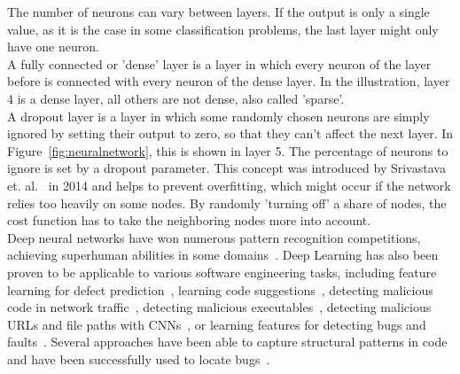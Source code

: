 \documentclass[
a4paper,
pagesize,
pdftex,
12pt,
twoside, %
BCOR=5mm, %
ngerman,
fleqn,
final,
]{scrartcl}
\begin{document}
	The number of neurons can vary between layers. If the output is only a single value, as it is the case in some classification problems, the last layer might only have one neuron.\\
	A fully connected or 'dense' layer is a layer in which every neuron of the layer before is connected with every neuron of the dense layer. In the illustration, layer 4 is a dense layer, all others are not dense, also called 'sparse'.\\
	A dropout layer is a layer in which some randomly chosen neurons are simply ignored by setting their output to zero, so that they can't affect the next layer. In Figure~\ref{fig:neuralnetwork}, this is shown in layer 5. The percentage of neurons to ignore is set by a dropout parameter. This concept was introduced by Srivastava et. al.~\cite{Srivastava.2014} in 2014 and helps to prevent overfitting, which might occur if the network relies too heavily on some nodes. By randomly 'turning off' a share of nodes, the cost function has to take the neighboring nodes more into account.\\
	Deep neural networks have won numerous pattern recognition competitions, achieving superhuman abilities in some domains~\cite{Schmidhuber.2015}. Deep Learning has also been proven to be applicable to various software engineering tasks, including feature learning for defect prediction~\cite{Wang.2016}, learning code suggestions~\cite{Bhoopchand.2016}, detecting malicious code in network traffic~\cite{Elovici.2007}, detecting malicious executables~\cite{Schultz.2000}, detecting malicious URLs and file paths with CNNs~\cite{Saxe.2017}, or learning features for detecting bugs and faults~\cite{Huo.2016,Gupta.2017b}. Several approaches have been able to capture structural patterns in code~\cite{Dam.2016} and have been successfully used to locate bugs~\cite{Huo.2016,Russell.2018}.\\
	
\end{document}
